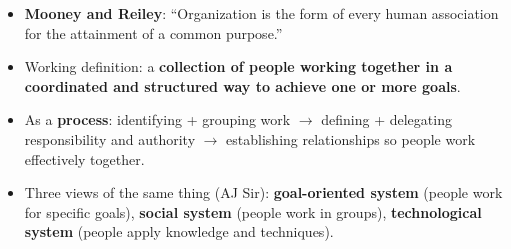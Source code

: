 \begin{itemize}
  \item \textbf{Mooney and Reiley}: ``Organization is the form of every human association for
    the attainment of a common purpose.''
  \item Working definition: a \textbf{collection of people working together in a coordinated
    and structured way to achieve one or more goals}.
  \item As a \textbf{process}: identifying + grouping work $\rightarrow$ defining +
    delegating responsibility and authority $\rightarrow$ establishing relationships so people
    work effectively together.
  \item Three views of the same thing (AJ Sir): \textbf{goal-oriented system} (people work
    for specific goals), \textbf{social system} (people work in groups),
    \textbf{technological system} (people apply knowledge and techniques).
\end{itemize}

